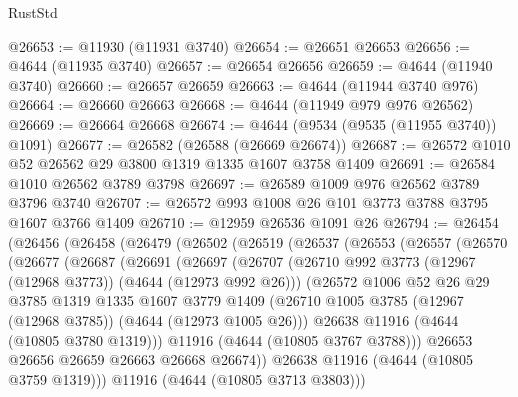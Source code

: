 \begin{lexlean}{RustStd}
\begin{coremodule}
@26653 := @11930 (@11931 @3740)
@26654 := @26651 @26653
@26656 := @4644 (@11935 @3740)
@26657 := @26654 @26656
@26659 := @4644 (@11940 @3740)
@26660 := @26657 @26659
@26663 := @4644 (@11944 @3740 @976)
@26664 := @26660 @26663
@26668 := @4644 (@11949 @979 @976 @26562)
@26669 := @26664 @26668
@26674 := @4644 (@9534 (@9535 (@11955 @3740)) @1091)
@26677 := @26582 (@26588 (@26669 @26674))
@26687 := @26572 @1010 @52 @26562 @29 @3800 @1319 @1335 @1607 @3758 @1409
@26691 := @26584 @1010 @26562 @3789 @3798
@26697 := @26589 @1009 @976 @26562 @3789 @3796 @3740
@26707 := @26572 @993 @1008 @26 @101 @3773 @3788 @3795 @1607 @3766 @1409
@26710 := @12959 @26536 @1091 @26
@26794 := @26454
    (@26456
      (@26458
        (@26479
          (@26502
            (@26519
              (@26537
                (@26553
                  (@26557
                    (@26570
                      (@26677
                        (@26687
                          (@26691
                            (@26697
                              (@26707
                                (@26710
                                  @992
                                  @3773
                                  (@12967 (@12968 @3773))
                                  (@4644 (@12973 @992 @26)))
                                (@26572
                                  @1006
                                  @52
                                  @26
                                  @29
                                  @3785
                                  @1319
                                  @1335
                                  @1607
                                  @3779
                                  @1409
                                  (@26710
                                    @1005
                                    @3785
                                    (@12967 (@12968 @3785))
                                    (@4644 (@12973 @1005 @26)))
                                  @26638
                                  @11916
                                  (@4644 (@10805 @3780 @1319)))
                                @11916
                                (@4644 (@10805 @3767 @3788)))
                              @26653
                              @26656
                              @26659
                              @26663
                              @26668
                              @26674))
                          @26638
                          @11916
                          (@4644 (@10805 @3759 @1319)))
                        @11916
                        (@4644 (@10805 @3713 @3803)))

\end{coremodule}
\end{lexlean}
